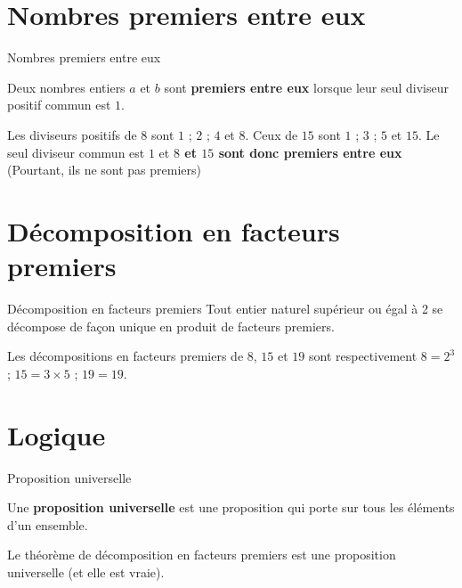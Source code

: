 \begin{pageCours}

\section{Nombres premiers entre eux}

  \begin{DefT}{Nombres premiers entre eux}

    Deux nombres entiers $a$ et $b$ sont \textbf{premiers entre eux}
    lorsque leur seul diviseur positif commun est $1$.
  \end{DefT}

\begin{Ex}
  Les diviseurs positifs de $8$ sont $1$ ; $2$ ; $4$ et $8$. Ceux de $15$ sont
  $1$ ; $3$ ; $5$ et $15$. Le seul diviseur commun est $1$ et \textbf{$8$ et $15$ sont donc premiers entre eux} (Pourtant, ils ne sont pas premiers)
\end{Ex}

\section{Décomposition en facteurs premiers}

  \begin{ThT}{Décomposition en facteurs premiers}
    Tout entier naturel supérieur ou égal à 2 se décompose de façon unique en produit de facteurs premiers.
  \end{ThT}


\begin{Exs}
Les décompositions en facteurs premiers de $8$, $15$ et $19$ sont respectivement  
$8=2^3$ ; $15=3 \times 5$ ; $19=19$.
  
\end{Exs}


 \section{Logique}

 
\begin{LogT}{Proposition universelle}

  Une \textbf{proposition universelle} est une proposition qui porte sur tous
  les éléments d'un ensemble. 

\end{LogT}
 
 
\begin{Rq} 
  Le théorème de décomposition en facteurs premiers est une proposition
  universelle (et elle est vraie).
  

\end{Rq}
\end{pageCours}
